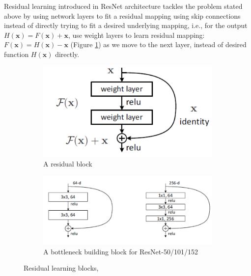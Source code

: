 \documentclass[12pt]{report}
\numberwithin{equation}{section}
\begin{document}
Residual learning introduced in ResNet architecture {\cite{He2015DeepRL}} tackles the problem stated above by using network layers to fit a residual mapping using skip connections instead of directly trying to fit a desired underlying mapping, i.e., for the output $H(\bm{x})= F(\bm{x}) + \bm{x}$, use weight layers to learn residual mapping: $F(\bm{x}) = H(\bm{x})-\bm{x}$ (Figure \ref{subfig:residual_block}) as we move to the next layer, instead of desired function $H(\bm{x})$ directly.
\begin{figure}[H]
\centering
	\begin{subfigure}[t]{\textwidth}
	\centering
	\includegraphics[scale=0.7]{png/residual_block.png}
 	\caption{A residual block}	 
	\label{subfig:residual_block}
	\end{subfigure}
	
	\medskip
	
	\begin{subfigure}[t]{\textwidth}
	\centering
	\includegraphics[scale=0.7]{png/bottleneck.png}		
	\caption{A bottleneck building block for ResNet-50/101/152}	 
	\label{subfig:bottleneck}
	\end{subfigure}
\caption[Residual learning blocks]{Residual learning blocks, }	 
\label{fig:residual_learning}
\end{figure} \noindent
\end{document}
